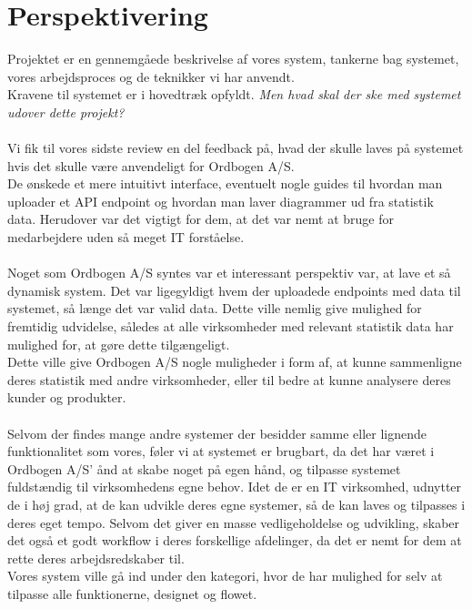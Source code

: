 \section{Perspektivering}
Projektet er en gennemgåede beskrivelse af vores system, tankerne bag systemet, vores arbejdsproces og de teknikker vi har anvendt.
\\
Kravene til systemet er i hovedtræk opfyldt. \textit{Men hvad skal der ske med systemet udover dette projekt?}
\\\\
Vi fik til vores sidste review en del feedback på, hvad der skulle laves på systemet hvis det skulle være anvendeligt for Ordbogen A/S.
\\
De ønskede et mere intuitivt interface, eventuelt nogle guides til hvordan man uploader et API endpoint og hvordan man laver diagrammer ud fra statistik data.
Herudover var det vigtigt for dem, at det var nemt at bruge for medarbejdere uden så meget IT forståelse.
\\\\
Noget som Ordbogen A/S syntes var et interessant perspektiv var, at lave et så dynamisk system. Det var ligegyldigt hvem der uploadede endpoints med data til systemet,
så længe det var valid data. Dette ville nemlig give mulighed for fremtidig udvidelse, således at alle virksomheder med relevant statistik data har mulighed for, at gøre dette tilgængeligt.
\\
Dette ville give Ordbogen A/S nogle muligheder i form af, at kunne sammenligne deres statistik med andre virksomheder, eller til bedre at kunne analysere deres kunder og produkter.
\\\\
Selvom der findes mange andre systemer der besidder samme eller lignende funktionalitet som vores, føler vi at systemet er brugbart,
da det har været i Ordbogen A/S' ånd at skabe noget på egen hånd, og tilpasse systemet fuldstændig til virksomhedens egne behov.
Idet de er en IT virksomhed, udnytter de i høj grad, at de kan udvikle deres egne systemer, så de kan laves og tilpasses i deres eget tempo.
Selvom det giver en masse vedligeholdelse og udvikling, skaber det også et godt workflow i deres forskellige afdelinger, da det er nemt for dem at rette deres arbejdsredskaber til.
\\
Vores system ville gå ind under den kategori, hvor de har mulighed for selv at tilpasse alle funktionerne, designet og flowet.

